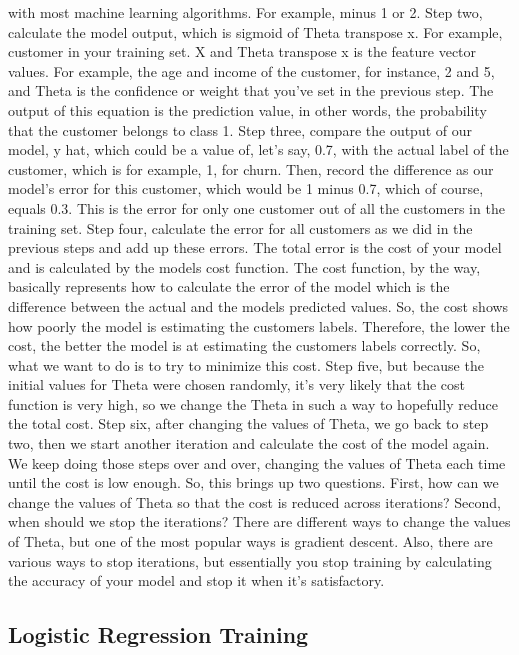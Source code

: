 with most machine learning algorithms. For example, minus 1 or 2. Step two, calculate the model output, which is sigmoid of Theta transpose x. For example, customer in your training set. X and Theta transpose x is the feature vector values. For example, the age and income of the customer, for instance, 2 and 5, and Theta is the confidence or weight that you've set in the previous step. The output of this equation is the prediction value, in other words, the probability that the customer belongs to class 1. Step three, compare the output of our model, y hat, which could be a value of, let's say, 0.7, with the actual label of the customer, which is for example, 1, for churn. Then, record the difference as our model's error for this customer, which would be 1 minus 0.7, which of course, equals 0.3. This is the error for only one customer out of all the customers in the training set. Step four, calculate the error for all customers as we did in the previous steps and add up these errors. The total error is the cost of your model and is calculated by the models cost function. The cost function, by the way, basically represents how to calculate the error of the model which is the difference between the actual and the models predicted values. So, the cost shows how poorly the model is estimating the customers labels. Therefore, the lower the cost, the better the model is at estimating the customers labels correctly. So, what we want to do is to try to minimize this cost. Step five, but because the initial values for Theta were chosen randomly, it's very likely that the cost function is very high, so we change the Theta in such a way to hopefully reduce the total cost. Step six, after changing the values of Theta, we go back to step two, then we start another iteration and calculate the cost of the model again. We keep doing those steps over and over, changing the values of Theta each time until the cost is low enough. So, this brings up two questions. First, how can we change the values of Theta so that the cost is reduced across iterations? Second, when should we stop the iterations? There are different ways to change the values of Theta, but one of the most popular ways is gradient descent. Also, there are various ways to stop iterations, but essentially you stop training by calculating the accuracy of your model and stop it when it's satisfactory. 
	
	\subsection{Logistic Regression Training}
	
